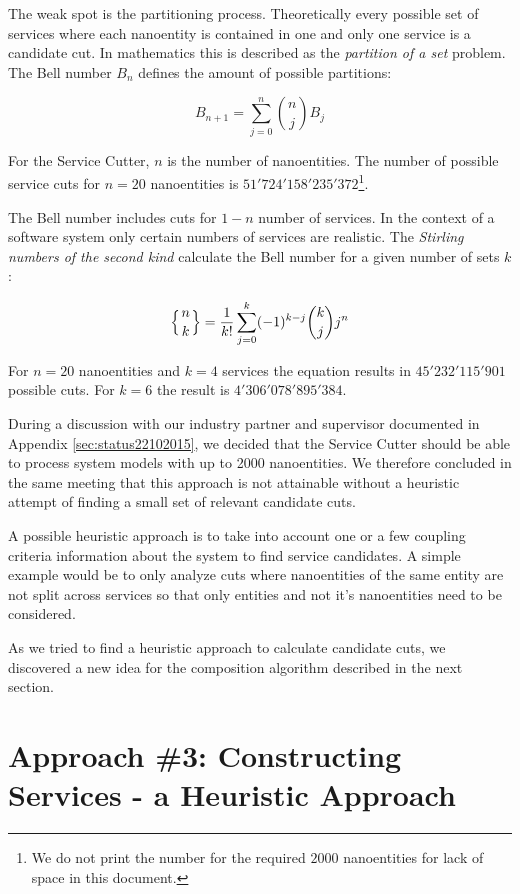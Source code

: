 The weak spot is the partitioning process. Theoretically every possible set of services where each nanoentity is contained in one and only one service is a candidate cut. In mathematics this is described as the \textit{partition of a set}\cite{partitionOfASet} problem. The Bell number $B_n$ defines the amount of possible partitions: 


\begin{displaymath}
B_{n+1}=\sum_{j=0}^n {n\choose j} B_j
\end{displaymath}

For the Service Cutter, $n$ is the number of nanoentities. The number of possible service cuts for $n=20$ nanoentities is $51'724'158'235'372$\footnote{We do not print the number for the required $2000$ nanoentities for lack of space in this document.}.

The Bell number includes cuts for $1 - n$ number of services. In the context of a software system only certain numbers of services are realistic. The \textit{Stirling numbers of the second kind} calculate the Bell number for a given number of sets $k$:

\begin{displaymath}
\left\{ {n \atop k}\right\} = \frac{1}{k!}\sum_{j=0}^{k} (-1)^{k-j} \binom{k}{j} j^n
\end{displaymath}

For $n=20$ nanoentities and $k=4$ services the equation results in $45'232'115'901$ possible cuts. For $k=6$ the result is $4'306'078'895'384$.

During a discussion with our industry partner and supervisor documented in Appendix \ref{sec:status22102015}, we decided that the Service Cutter should be able to process system models with up to 2000 nanoentities. We therefore concluded in the same meeting that this approach is not attainable without a heuristic attempt of finding a small set of relevant candidate cuts. 

A possible heuristic approach is to take into account one or a few coupling criteria information about the system to find service candidates. A simple example would be to only analyze cuts where nanoentities of the same entity are not split across services so that only entities and not it's nanoentities need to be considered.

As we tried to find a heuristic approach to calculate candidate cuts, we discovered a new idea for the composition algorithm described in the next section. 

\section{Approach \#3: Constructing Services - a Heuristic Approach}

